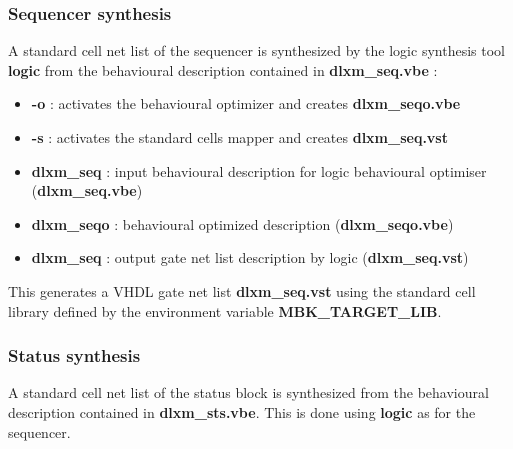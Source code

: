     		\subsubsection{Sequencer synthesis}

A standard cell net list of the sequencer is synthesized by the logic synthesis tool {\bf logic}
from the behavioural description contained in {\bf dlxm\_seq.vbe} :


\begin{itemize}
\item
{\bf -o } : activates the behavioural optimizer and creates {\bf dlxm\_seqo.vbe}
\item
{\bf -s } : activates the standard cells mapper and creates {\bf dlxm\_seq.vst}
\item
{\bf dlxm\_seq} : input behavioural description for logic behavioural optimiser ({\bf dlxm\_seq.vbe})
\item
{\bf dlxm\_seqo} : behavioural optimized description ({\bf dlxm\_seqo.vbe})
\item
{\bf dlxm\_seq} : output gate net list description by logic ({\bf dlxm\_seq.vst})
\end{itemize}


This generates a VHDL gate net list {\bf dlxm\_seq.vst} using the
standard cell library defined by the environment variable
{\bf MBK\_TARGET\_LIB}.


		\subsubsection{Status synthesis}

A standard cell net list of the status block is synthesized from the
behavioural description contained in {\bf dlxm\_sts.vbe}. This is
done using {\bf logic} as for the sequencer.



